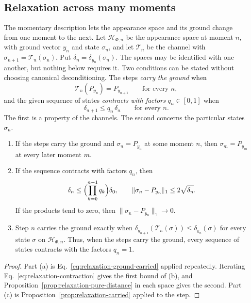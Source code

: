 \subsection{Relaxation across many moments}
\label{subsec:relaxation-moments}
The momentary description lets the appearance space and its ground change from one moment to the next. Let $\mathcal H_{\Phi,n}$ be the appearance space at moment $n$, with ground vector $y_n$ and state $\sigma_n$, and let $\mathcal T_n$ be the channel with $\sigma_{n+1}=\mathcal T_n(\sigma_n)$. Put $\delta_n=\delta_{y_n}(\sigma_n)$. The spaces may be identified with one another, but nothing below requires it. Two conditions can be stated without choosing canonical deconditioning. The steps \emph{carry the ground} when
\begin{equation}
 \mathcal T_n(P_{y_n})=P_{y_{n+1}}\qquad\text{for every }n,
 \label{eq:relaxation-ground-carried}
\end{equation}
and the given sequence of states \emph{contracts with factors} $q_n\in[0,1]$ when
\begin{equation}
 \delta_{n+1}\le q_n\,\delta_n\qquad\text{for every }n .
 \label{eq:relaxation-contraction}
\end{equation}
The first is a property of the channels. The second concerns the particular states $\sigma_n$.

\begin{proposition}
\label{prop:relaxation-moments}
\begin{enumerate}
\item[(a)] If the steps carry the ground and $\sigma_n=P_{y_n}$ at some moment $n$, then $\sigma_m=P_{y_m}$ at every later moment $m$.
\item[(b)] If the sequence contracts with factors $q_n$, then
\begin{equation}
 \delta_n\le\Bigl(\prod_{k=0}^{n-1}q_k\Bigr)\delta_0,
 \qquad \|\sigma_n-P_{y_n}\|_1\le2\sqrt{\delta_n}.
 \label{eq:relaxation-product}
\end{equation}
If the products tend to zero, then $\|\sigma_n-P_{y_n}\|_1\to0$.
\item[(c)] Step $n$ carries the ground exactly when $\delta_{y_{n+1}}(\mathcal T_n(\sigma))\le\delta_{y_n}(\sigma)$ for every state $\sigma$ on $\mathcal H_{\Phi,n}$. Thus, when the steps carry the ground, every sequence of states contracts with the factors $q_n=1$.
\end{enumerate}
\end{proposition}
\begin{proof}
Part (a) is Eq.~\eqref{eq:relaxation-ground-carried} applied repeatedly. Iterating Eq.~\eqref{eq:relaxation-contraction} gives the first bound of (b), and Proposition~\ref{prop:relaxation-pure-distance} in each space gives the second. Part (c) is Proposition~\ref{prop:relaxation-carried} applied to the step.
\end{proof}


